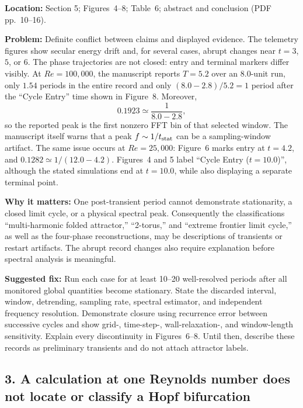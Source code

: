 \documentclass[11pt]{article}
\newcommand{\location}[1]{\textbf{Location:} #1\par}
\newcommand{\problem}[1]{\textbf{Problem:} #1\par}
\newcommand{\impact}[1]{\textbf{Why it matters:} #1\par}
\newcommand{\fixit}[1]{\textbf{Suggested fix:} #1\par}
\begin{document}
\location{Section 5; Figures~4--8; Table~6; abstract and conclusion (PDF pp.~10--16).}
\problem{Definite conflict between claims and displayed evidence.  The telemetry figures show secular energy drift and, for several cases, abrupt changes near $t=3$, $5$, or $6$.  The phase trajectories are not closed: entry and terminal markers differ visibly.  At $Re=100{,}000$, the manuscript reports $T=5.2$ over an $8.0$-unit run, only $1.54$ periods in the entire record and only $(8.0-2.8)/5.2=1$ period after the ``Cycle Entry'' time shown in Figure~8.  Moreover,
\[
 0.1923 \simeq \frac{1}{8.0-2.8},
\]
so the reported peak is the first nonzero FFT bin of that selected window.  The manuscript itself warns that a peak $f\sim1/t_{\rm stat}$ can be a sampling-window artifact.  The same issue occurs at $Re=25{,}000$: Figure~6 marks entry at $t=4.2$, and $0.1282\simeq1/(12.0-4.2)$.  Figures~4 and 5 label ``Cycle Entry ($t=10.0$)'', although the stated simulations end at $t=10.0$, while also displaying a separate terminal point.}
\impact{One post-transient period cannot demonstrate stationarity, a closed limit cycle, or a physical spectral peak.  Consequently the classifications ``multi-harmonic folded attractor,'' ``2-torus,'' and ``extreme frontier limit cycle,'' as well as the four-phase reconstructions, may be descriptions of transients or restart artifacts.  The abrupt record changes also require explanation before spectral analysis is meaningful.}
\fixit{Run each case for at least 10--20 well-resolved periods after all monitored global quantities become stationary.  State the discarded interval, window, detrending, sampling rate, spectral estimator, and independent frequency resolution.  Demonstrate closure using recurrence error between successive cycles and show grid-, time-step-, wall-relaxation-, and window-length sensitivity.  Explain every discontinuity in Figures~6--8.  Until then, describe these records as preliminary transients and do not attach attractor labels.}

\subsection*{3. A calculation at one Reynolds number does not locate or classify a Hopf bifurcation}
\end{document}
